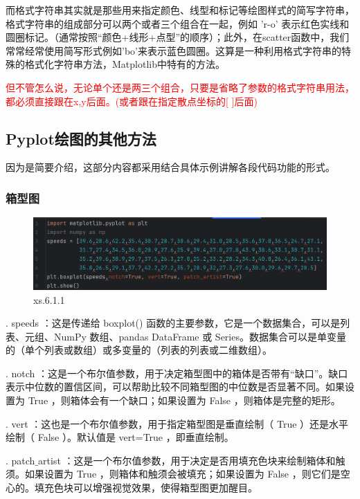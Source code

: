 \documentclass[12pt]{article}
\begin{document}
而格式字符串其实就是那些用来指定颜色、线型和标记等绘图样式的简写字符串，格式字符串的组成部分可以两个或者三个组合在一起，例如  'r-o'  表示红色实线和圆圈标记。（通常按照“颜色+线形+点型”的顺序）；此外，在scatter函数中，我们常常经常使用简写形式例如'bo'来表示蓝色圆圈。这算是一种利用格式字符串的特殊的格式化字符串方法，Matplotlib中特有的方法。

\textcolor{red}{但不管怎么说，无论单个还是两三个组合，只要是省略了参数的格式字符串用法，都必须直接跟在x,y后面。(或者跟在指定散点坐标的[ ]后面)}

\subsection{Pyplot绘图的其他方法}\label{Pyplot绘图的其他方法}
因为是简要介绍，这部分内容都采用结合具体示例讲解各段代码功能的形式。
\subsubsection{箱型图}
\begin{figure}[H]
    \centering
    \includegraphics[width=1\linewidth]{箱型图 program1.png}
    \caption{xs.6.1.1}
    \label{fig:enter-label}
\end{figure}
.   speeds  ：这是传递给   boxplot()   函数的主要参数，它是一个数据集合，可以是列表、元组、NumPy 数组、pandas DataFrame 或 Series。数据集合可以是单变量的（单个列表或数组）或多变量的（列表的列表或二维数组）。

.   notch  ：这是一个布尔值参数，用于决定箱型图中的箱体是否带有“缺口”。缺口表示中位数的置信区间，可以帮助比较不同箱型图的中位数是否显著不同。如果设置为   True  ，则箱体会有一个缺口；如果设置为   False  ，则箱体是完整的矩形。

.   vert  ：这也是一个布尔值参数，用于指定箱型图是垂直绘制（  True  ）还是水平绘制（  False  ）。默认值是   vert=True  ，即垂直绘制。

.   patch$\_$artist  ：这是一个布尔值参数，用于决定是否用填充色块来绘制箱体和触须。如果设置为   True  ，则箱体和触须会被填充；如果设置为   False  ，则它们是空心的。填充色块可以增强视觉效果，使得箱型图更加醒目。
\end{document}
